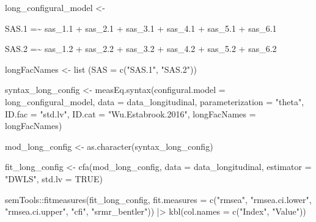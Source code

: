 \documentclass[
  letterpaper,
  DIV=11,
  numbers=noendperiod]{scrreprt}
\newenvironment{Shaded}{\begin{snugshade}}{\end{snugshade}}
\newcommand{\AttributeTok}[1]{\textcolor[rgb]{0.40,0.45,0.13}{#1}}
\newcommand{\ConstantTok}[1]{\textcolor[rgb]{0.56,0.35,0.01}{#1}}
\newcommand{\FunctionTok}[1]{\textcolor[rgb]{0.28,0.35,0.67}{#1}}
\newcommand{\NormalTok}[1]{\textcolor[rgb]{0.00,0.23,0.31}{#1}}
\newcommand{\OtherTok}[1]{\textcolor[rgb]{0.00,0.23,0.31}{#1}}
\newcommand{\SpecialCharTok}[1]{\textcolor[rgb]{0.37,0.37,0.37}{#1}}
\newcommand{\StringTok}[1]{\textcolor[rgb]{0.13,0.47,0.30}{#1}}
\begin{document}
\begin{Shaded}
\begin{Highlighting}[]
\NormalTok{long\_configural\_model }\OtherTok{\textless{}{-}} \StringTok{\textquotesingle{}}

\StringTok{SAS.1 =\textasciitilde{} sas\_1.1 + sas\_2.1 + sas\_3.1 + sas\_4.1 + sas\_5.1 + sas\_6.1}

\StringTok{SAS.2 =\textasciitilde{} sas\_1.2 + sas\_2.2 + sas\_3.2 + sas\_4.2 + sas\_5.2 + sas\_6.2}

\StringTok{\textquotesingle{}}

\NormalTok{longFacNames }\OtherTok{\textless{}{-}} \FunctionTok{list}\NormalTok{ (}\AttributeTok{SAS =} \FunctionTok{c}\NormalTok{(}\StringTok{"SAS.1"}\NormalTok{, }\StringTok{"SAS.2"}\NormalTok{))}

\NormalTok{syntax\_long\_config }\OtherTok{\textless{}{-}} \FunctionTok{measEq.syntax}\NormalTok{(}\AttributeTok{configural.model =}\NormalTok{ long\_configural\_model,}
                               \AttributeTok{data =}\NormalTok{ data\_longitudinal,}
                               \AttributeTok{parameterization =} \StringTok{"theta"}\NormalTok{,}
                               \AttributeTok{ID.fac =} \StringTok{"std.lv"}\NormalTok{, }\AttributeTok{ID.cat =} \StringTok{"Wu.Estabrook.2016"}\NormalTok{,}
                               \AttributeTok{longFacNames =}\NormalTok{ longFacNames)}

\NormalTok{mod\_long\_config }\OtherTok{\textless{}{-}} \FunctionTok{as.character}\NormalTok{(syntax\_long\_config)}

\NormalTok{fit\_long\_config }\OtherTok{\textless{}{-}} \FunctionTok{cfa}\NormalTok{(mod\_long\_config, }
                      \AttributeTok{data =}\NormalTok{ data\_longitudinal, }
                      \AttributeTok{estimator =} \StringTok{"DWLS"}\NormalTok{, }
                      \AttributeTok{std.lv =} \ConstantTok{TRUE}\NormalTok{)}

\NormalTok{semTools}\SpecialCharTok{::}\FunctionTok{fitmeasures}\NormalTok{(fit\_long\_config, }\AttributeTok{fit.measures =} \FunctionTok{c}\NormalTok{(}\StringTok{"rmsea"}\NormalTok{, }\StringTok{"rmsea.ci.lower"}\NormalTok{, }\StringTok{"rmsea.ci.upper"}\NormalTok{, }\StringTok{"cfi"}\NormalTok{, }\StringTok{"srmr\_bentler"}\NormalTok{)) }\SpecialCharTok{|\textgreater{}} 
  \FunctionTok{kbl}\NormalTok{(}\AttributeTok{col.names =} \FunctionTok{c}\NormalTok{(}\StringTok{"Index"}\NormalTok{, }\StringTok{"Value"}\NormalTok{))}
\end{Highlighting}
\end{Shaded}
\end{document}
